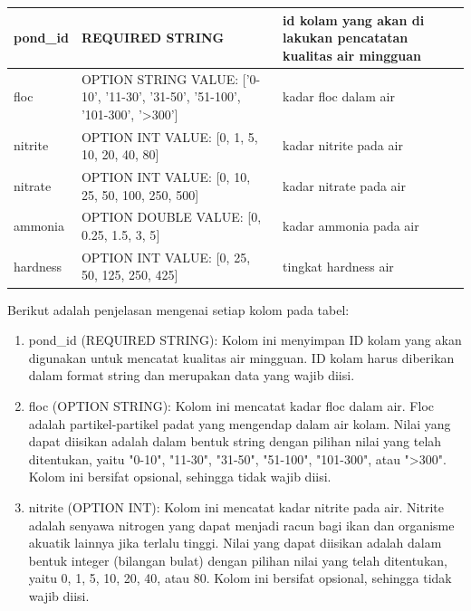 \begin{enumerate}[1.]
\begin{longtable}{| l | p{5cm} | p{5cm} |}
pond\_id & REQUIRED STRING                                                                               & id kolam yang akan di lakukan pencatatan kualitas air mingguan \\ \hline
floc     & OPTION STRING VALUE: {[}'0-10', '11-30', '31-50', '51-100', '101-300', '\textgreater{}300'{]} & kadar floc dalam air                                           \\ \hline
nitrite  & OPTION INT VALUE: {[}0, 1, 5, 10, 20, 40, 80{]}                                               & kadar nitrite pada air                                         \\ \hline
nitrate  & OPTION INT VALUE: {[}0, 10, 25, 50, 100, 250, 500{]}                                          & kadar nitrate pada air                                         \\ \hline
ammonia  & OPTION DOUBLE VALUE: {[}0, 0.25, 1.5, 3, 5{]}                                                 & kadar ammonia pada air                                         \\ \hline
hardness & OPTION INT VALUE: {[}0, 25, 50, 125, 250, 425{]}                                              & tingkat hardness air                                           \\ \hline
\end{longtable}



Berikut adalah penjelasan mengenai setiap kolom pada tabel:

\begin{enumerate}
\item pond\_id (REQUIRED STRING): Kolom ini menyimpan ID kolam yang akan digunakan untuk mencatat kualitas air mingguan. ID kolam harus diberikan dalam format string dan merupakan data yang wajib diisi.

\item floc (OPTION STRING): Kolom ini mencatat kadar floc dalam air. Floc adalah partikel-partikel padat yang mengendap dalam air kolam. Nilai yang dapat diisikan adalah dalam bentuk string dengan pilihan nilai yang telah ditentukan, yaitu "0-10", "11-30", "31-50", "51-100", "101-300", atau "\textgreater300". Kolom ini bersifat opsional, sehingga tidak wajib diisi.

\item nitrite (OPTION INT): Kolom ini mencatat kadar nitrite pada air. Nitrite adalah senyawa nitrogen yang dapat menjadi racun bagi ikan dan organisme akuatik lainnya jika terlalu tinggi. Nilai yang dapat diisikan adalah dalam bentuk integer (bilangan bulat) dengan pilihan nilai yang telah ditentukan, yaitu 0, 1, 5, 10, 20, 40, atau 80. Kolom ini bersifat opsional, sehingga tidak wajib diisi.


\end{enumerate}
\end{enumerate}
